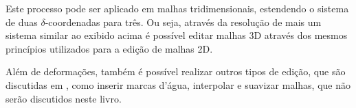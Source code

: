 Este processo pode ser aplicado em malhas tridimensionais, estendendo o sistema de duas $\delta$-coordenadas para três. Ou seja, através da resolução de mais um sistema similar ao exibido acima é possível editar malhas 3D através dos mesmos princípios utilizados para a edição de malhas 2D.  

Além de deformações, também é possível realizar outros tipos de edição, que são discutidas em \cite{sorkine2006}, como inserir marcas d'água, interpolar e suavizar malhas, que não serão discutidos neste livro.

